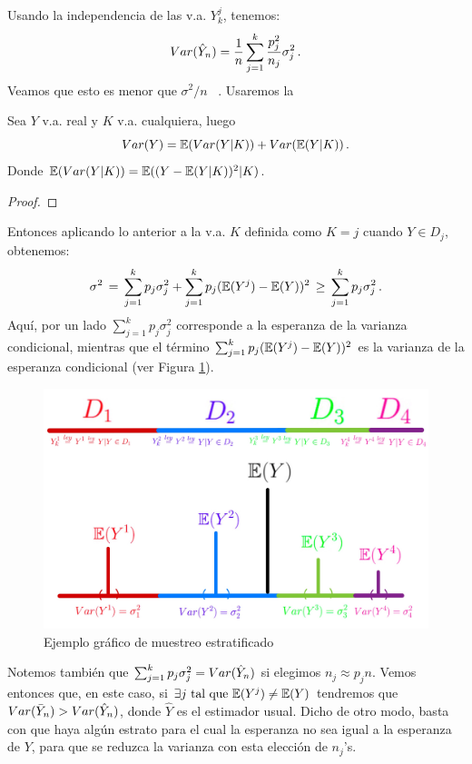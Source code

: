 \newline Usando la independencia de las v.a.  $Y_{k}^j$,  tenemos: %
$$ Var(\hat{Y}_n)=\displaystyle\frac{1}{n}\sum^k_{j=1}\frac{p_j^2}{n_j}\sigma^2_j \, .$$
Veamos que esto es menor que $\sigma^2/n$ \, . Usaremos la
\begin{proposition}
Sea $Y$ v.a. real y $K$ v.a. cualquiera, luego
$$ Var(Y)=\mathbb{E}(Var(Y|K))+Var(\mathbb{E}(Y|K)) \, .$$
Donde $\mathbb{E}(Var(Y|K))=\mathbb{E}((Y-\mathbb{E}(Y|K))^2|K)$.
\end{proposition}
\begin{proof}
\ejercicio
\end{proof}
Entonces aplicando lo anterior a  la v.a. $K$ definida como $K=j$ cuando $Y\in D_j$, obtenemos:
$$ \sigma^2\,=\,\displaystyle\sum^k_{j=1}p_j\sigma^2_j+\sum^k_{j=1}p_j(\mathbb{E}(Y^j)-\mathbb{E}(Y))^2\,\geq \,\sum^k_{j=1}p_j\sigma^2_j \, .$$
Aqu\'i, por un lado $\sum^k_{j=1}p_j\sigma^2_j$ corresponde a la esperanza de la varianza condicional, mientras que el término $\sum^k_{j=1}p_j(\mathbb{E}(Y^j)-\mathbb{E}(Y))^2$ es la varianza de la esperanza condicional (ver Figura \ref{fig:estrat}). 
\begin{figure}
    \centering
    \includegraphics[scale=0.16]{img/clase_09_pag_3.jpg}
    \caption{Ejemplo gráfico de muestreo estratificado}
    \label{fig:estrat}
\end{figure}

\newp Notemos tambi\'en que  $\sum^k_{j=1}p_j\sigma^2_j= Var(\hat{Y}_n)$ si elegimos  $n_j\approx p_jn$.  Vemos entonces que, en este caso,   si $\exists j\mbox{ tal que }\mathbb{E}(Y^j)\neq\mathbb{E}(Y)$ tendremos que $Var(\bar{Y}_n)>Var(\hat{Y}_n)$, donde $\hat{Y}$ es el estimador usual.   Dicho de otro modo, basta con que haya algún estrato para el cual la esperanza no sea igual a la esperanza de $Y$, para que se reduzca la varianza con esta elecci\'on de $n_j$'s.


